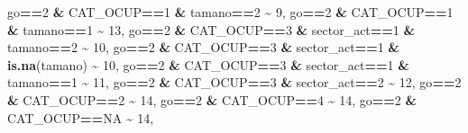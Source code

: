 \documentclass[
]{article}
\newenvironment{Shaded}{\begin{snugshade}}{\end{snugshade}}
\newcommand{\ConstantTok}[1]{\textcolor[rgb]{0.56,0.35,0.01}{#1}}
\newcommand{\DecValTok}[1]{\textcolor[rgb]{0.00,0.00,0.81}{#1}}
\newcommand{\FunctionTok}[1]{\textcolor[rgb]{0.13,0.29,0.53}{\textbf{#1}}}
\newcommand{\NormalTok}[1]{#1}
\newcommand{\SpecialCharTok}[1]{\textcolor[rgb]{0.81,0.36,0.00}{\textbf{#1}}}
\begin{document}
\begin{Shaded}
\begin{Highlighting}[]
\NormalTok{                               go}\SpecialCharTok{==}\DecValTok{2} \SpecialCharTok{\&}\NormalTok{ CAT\_OCUP}\SpecialCharTok{==}\DecValTok{1} \SpecialCharTok{\&}\NormalTok{ tamano}\SpecialCharTok{==}\DecValTok{2} \SpecialCharTok{\textasciitilde{}} \DecValTok{9}\NormalTok{,}
\NormalTok{                               go}\SpecialCharTok{==}\DecValTok{2} \SpecialCharTok{\&}\NormalTok{ CAT\_OCUP}\SpecialCharTok{==}\DecValTok{1} \SpecialCharTok{\&}\NormalTok{ tamano}\SpecialCharTok{==}\DecValTok{1}  \SpecialCharTok{\textasciitilde{}} \DecValTok{13}\NormalTok{,}
\NormalTok{                               go}\SpecialCharTok{==}\DecValTok{2} \SpecialCharTok{\&}\NormalTok{ CAT\_OCUP}\SpecialCharTok{==}\DecValTok{3} \SpecialCharTok{\&}\NormalTok{ sector\_act}\SpecialCharTok{==}\DecValTok{1} \SpecialCharTok{\&}\NormalTok{ tamano}\SpecialCharTok{==}\DecValTok{2} \SpecialCharTok{\textasciitilde{}} \DecValTok{10}\NormalTok{,}
\NormalTok{                               go}\SpecialCharTok{==}\DecValTok{2} \SpecialCharTok{\&}\NormalTok{ CAT\_OCUP}\SpecialCharTok{==}\DecValTok{3} \SpecialCharTok{\&}\NormalTok{ sector\_act}\SpecialCharTok{==}\DecValTok{1} \SpecialCharTok{\&} \FunctionTok{is.na}\NormalTok{(tamano) }\SpecialCharTok{\textasciitilde{}} \DecValTok{10}\NormalTok{,}
\NormalTok{                               go}\SpecialCharTok{==}\DecValTok{2} \SpecialCharTok{\&}\NormalTok{ CAT\_OCUP}\SpecialCharTok{==}\DecValTok{3} \SpecialCharTok{\&}\NormalTok{ sector\_act}\SpecialCharTok{==}\DecValTok{1} \SpecialCharTok{\&}\NormalTok{ tamano}\SpecialCharTok{==}\DecValTok{1}  \SpecialCharTok{\textasciitilde{}} \DecValTok{11}\NormalTok{,}
\NormalTok{                               go}\SpecialCharTok{==}\DecValTok{2} \SpecialCharTok{\&}\NormalTok{ CAT\_OCUP}\SpecialCharTok{==}\DecValTok{3} \SpecialCharTok{\&}\NormalTok{ sector\_act}\SpecialCharTok{==}\DecValTok{2}  \SpecialCharTok{\textasciitilde{}} \DecValTok{12}\NormalTok{,}
\NormalTok{                               go}\SpecialCharTok{==}\DecValTok{2} \SpecialCharTok{\&}\NormalTok{ CAT\_OCUP}\SpecialCharTok{==}\DecValTok{2}  \SpecialCharTok{\textasciitilde{}} \DecValTok{14}\NormalTok{,}
\NormalTok{                               go}\SpecialCharTok{==}\DecValTok{2} \SpecialCharTok{\&}\NormalTok{ CAT\_OCUP}\SpecialCharTok{==}\DecValTok{4}  \SpecialCharTok{\textasciitilde{}} \DecValTok{14}\NormalTok{,}
\NormalTok{                               go}\SpecialCharTok{==}\DecValTok{2} \SpecialCharTok{\&}\NormalTok{ CAT\_OCUP}\SpecialCharTok{==}\ConstantTok{NA}     \SpecialCharTok{\textasciitilde{}} \DecValTok{14}\NormalTok{,}
         

\end{Highlighting}
\end{Shaded}
\end{document}
